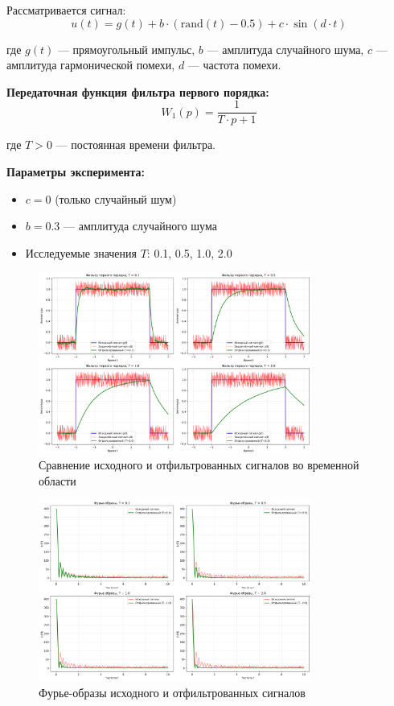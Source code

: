 Рассматривается сигнал:
\begin{equation}
u(t) = g(t) + b \cdot (\text{rand}(t) - 0.5) + c \cdot \sin(d \cdot t)
\end{equation}

где $g(t)$ — прямоугольный импульс, $b$ — амплитуда случайного шума, $c$ — амплитуда гармонической помехи, $d$ — частота помехи.

\textbf{Передаточная функция фильтра первого порядка:}
\begin{equation}
W_1(p) = \frac{1}{T \cdot p + 1}
\end{equation}

где $T > 0$ — постоянная времени фильтра.

\textbf{Параметры эксперимента:}
\begin{itemize}
    \item $c = 0$ (только случайный шум)
    \item $b = 0.3$ — амплитуда случайного шума
    \item Исследуемые значения $T$: 0.1, 0.5, 1.0, 2.0
\end{itemize}

\begin{figure}[H]
    \centering
    \includegraphics[width=0.8\textwidth]{images/task2/first_order_filter_time_domain.png}
    \caption{Сравнение исходного и отфильтрованных сигналов во временной области}
    \label{fig:first_order_time}
\end{figure}

\begin{figure}[H]
    \centering
    \includegraphics[width=0.8\textwidth]{images/task2/first_order_filter_freq_domain.png}
    \caption{Фурье-образы исходного и отфильтрованных сигналов}
    \label{fig:first_order_freq}
\end{figure}

